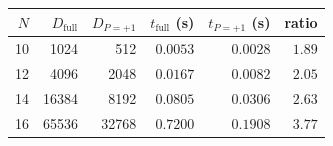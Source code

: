 \begin{tabular}{rrrrrr}
\toprule
$N$ & $D_{\text{full}}$ & $D_{P=+1}$ & $t_{\text{full}}$ (s) & $t_{P=+1}$ (s) & ratio \\
\midrule
10 & 1024 & 512 & $0.0053$ & $0.0028$ & $1.89$ \\
12 & 4096 & 2048 & $0.0167$ & $0.0082$ & $2.05$ \\
14 & 16384 & 8192 & $0.0805$ & $0.0306$ & $2.63$ \\
16 & 65536 & 32768 & $0.7200$ & $0.1908$ & $3.77$ \\
\bottomrule
\end{tabular}
